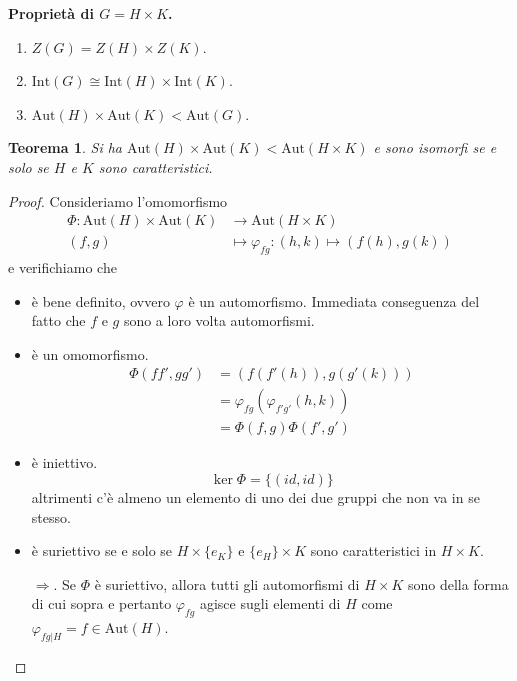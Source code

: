 \documentclass[a4paper]{article}
\newtheorem{theorem}{Teorema}[section]
\theoremstyle{remark}
\theoremstyle{definition}
\newcommand{\Aut}[1]{\mathrm{Aut}\left( #1 \right)}
\newcommand{\Int}[1]{\mathrm{Int}\left( #1 \right)}
\newcommand{\fun}[5]{\begin{align*}
	#1 \colon #2 &\to #3 \\
	#4 &\mapsto #5
	\end{align*}}
\begin{document}
\begin{multicols}{2}
\textbf{Proprietà di $ G = H \times K $.}
\begin{enumerate}
	\item $ Z(G) = Z(H) \times Z(K) $.
	\item $ \Int{G} \cong \Int{H} \times \Int{K} $.
	\item $ \Aut{H} \times \Aut{K} < \Aut{G} $.
\end{enumerate}
\begin{theorem}
	Si ha $ \Aut{H} \times \Aut{K} < \Aut{H \times K} $ e sono isomorfi se e solo se $ H $ e $ K $ sono caratteristici.
\end{theorem}
\begin{proof}
	Consideriamo l'omomorfismo \fun{\Phi}{\Aut{H} \times \Aut{K}}{\Aut{H \times K}}{(f, g)}{\varphi_{fg}: (h, k) \mapsto \left(f(h), g(k)\right)}
	e verifichiamo che
	\begin{itemize}
		\item è bene definito, ovvero $ \varphi $ è un automorfismo. Immediata conseguenza del fatto che $ f $ e $ g $ sono a loro volta automorfismi.
		\item è un omomorfismo.  \begin{align*}
			\Phi(ff',gg') &= \left( f(f'(h)), g(g'(k)) \right)\\& = \varphi_{fg}(\varphi_{f'g'}(h, k)) \\&= \Phi(f, g)\Phi(f',g') 
		\end{align*}
		\item è iniettivo.
		\[ \ker\Phi = \{ (id, id) \} \]
		altrimenti c'è almeno un elemento di uno dei due gruppi che non va in se stesso.
		
		\item è suriettivo se e solo se $ H\times\{e_K\} $ e $ \{e_H\}\times K $ sono caratteristici in $ H \times K $.
		
		$ \Rightarrow $. Se $ \Phi $ è suriettivo, allora tutti gli automorfismi di $ H \times K $ sono della forma di cui sopra e pertanto $ \varphi_{fg} $ agisce sugli elementi di $ H $ come $ \varphi_{fg|H} = f \in \Aut{H} $.
		

\end{itemize}
\end{proof}
\end{multicols}
\end{document}
